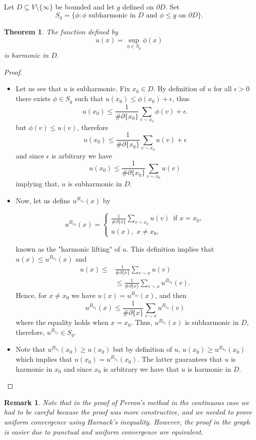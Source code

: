 \documentclass{article}
\newtheorem{theorem}{Theorem}
\newtheorem{remark}{Remark}
\begin{document}
Let $D\subseteq V\setminus \{\infty\}$ be bounded and let $g$ defined on $\partial D$. Set
\[
S_g=\{\phi: \phi \text{ subharmonic in } D \text{ and } \phi\leq g \text{ on } \partial D\}.
\]
\begin{theorem}
	The function defined by
	\[
	u(x)=\sup \limits_{\phi \in S_g}\phi(x) 
	\]
	is harmonic in $D$.
\end{theorem}
\begin{proof}
	\hfill
	\begin{itemize}
		\item[i)] Let us see that $u$ is subharmonic.
		Fix $x_0\in D$. By definition of $u$ for all $\epsilon >0$ there exists $\phi \in S_g$ such that $u(x_0)\leq \phi(x_0)+\epsilon$, thus
		\[
		u(x_0)\leq \frac{1}{\#\partial \{x_0\}}\sum \limits_{v\sim x_0}\phi(v)+\epsilon.
		\]
		but $\phi(v)\leq u(v)$, therefore
		\[
		u(x_0)\leq\frac{1}{\#\partial \{x_0\}}\sum \limits_{v\sim x_0}u(v)+\epsilon
		\]
		and since $\epsilon$ is arbitrary we have 
		\[
		u(x_0)\leq\frac{1}{\#\partial \{x_0\}}\sum \limits_{v\sim x_0}u(v)
		\]
		implying that, $u$ is subharmonic in $D$.
		\item[ii)] Now, let us define $u^{B_{x_0}}(x)$  by
        
		\begin{equation*}
		u^{B_{x_0}}(x)=
		\begin{cases}
		\frac{1}{\#\partial \{x\}}\sum \limits_{v\sim x_0}u(v)\,\text{ if } x=x_0,\\
		u(x), \,\, x\neq x_0,
		\end{cases}
		\end{equation*}
        
		 known as the "harmonic lifting" of $u$. This definition implies that $u(x)\leq u^{B_{x_0}}(x)$ and 
		\begin{align*}
		u(x)\leq& \frac{1}{\#\partial \{x\}}\sum \limits_{v\sim x}u(v)\\
		&\leq \frac{1}{\#\partial \{x\}}\sum \limits_{v\sim x} u^{B_{x_0}}(v).
		\end{align*}
		Hence, for $x\neq x_0$ we have $u(x)= u^{B_{x_0}}(x)$, and then
		\[
		u^{B_{x_0}}(x)\leq \frac{1}{\#\partial \{x\}}\sum \limits_{v\sim x} u^{B_{x_0}}(v)
		\]
		where the equality holds when $x=x_0$. Thus, $u^{B_{x_0}}(x)$ is subharmonic in $D$, therefore, $u^{B_{x_0}}\in S_g$.

        
		\item[iii)] Note that $u^{B_{x_0}}(x_0)\geq u(x_0)$ but by definition of $u$, $u(x_0)\geq u^{B_{x_0}}(x_0)$ which implies that $u(x_0)=u^{B_{x_0}}(x_0)$. The latter guarantees that $u$ is harmonic in $x_0$ and since $x_0$ is arbitrary we have that $u$ is harmonic in $D$.
	\end{itemize}
\end{proof}
\begin{remark}
	Note that in the proof of Perron's method in the continuous case we had to be careful because the proof was more constructive, and we needed to prove uniform convergence using  Harnack's inequality. However, the proof in the graph is easier due to punctual and uniform convergence are equivalent.
\end{remark}
\end{document}
